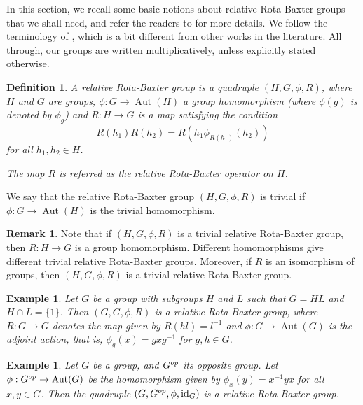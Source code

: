 \documentclass[11pt]{amsart}
\theoremstyle{thrm}
\theoremstyle{plain}
\newtheorem{defn}[thm]{Definition}
\newtheorem{example}[thm]{Example}
\theoremstyle{definition}
\newtheorem{remark}[equation]{Remark}
\newcommand{\Id}{\operatorname{id}}
\newcommand{\Aut}{\operatorname{Aut} }
\numberwithin{equation}{section}
\begin{document}
In this section, we recall some basic notions about relative Rota-Baxter groups that we shall need, and refer the readers to \cite{JYC22, NM1} for more details. We follow the  terminology of \cite{NM1}, which is a bit different from other works in the literature. All through, our groups are written multiplicatively, unless explicitly stated otherwise.

\begin{defn}
A relative Rota-Baxter group is a quadruple $(H, G, \phi, R)$, where $H$ and $G$ are groups, $\phi: G \rightarrow \Aut(H)$ a group homomorphism (where $\phi(g)$ is denoted by $\phi_g$) and $R: H \rightarrow G$ is a map satisfying the condition $$R(h_1) R(h_2)=R(h_1 \phi_{R(h_1)}(h_2))$$ for all $h_1, h_2 \in H$. 
\par
\noindent The map $R$ is referred as the relative Rota-Baxter operator on $H$.
\end{defn}

We say that the relative Rota-Baxter group  $(H, G, \phi, R)$ is trivial if $\phi:G \to \Aut(H)$ is the trivial homomorphism.


\begin{remark}
Note that if $(H, G, \phi, R)$ is  a trivial relative Rota-Baxter group, then $R:H \rightarrow G$ is a group homomorphism. Different homomorphisms give different trivial relative Rota-Baxter groups. Moreover, if $R$ is an isomorphism of groups, then $(H, G, \phi, R)$ is  a trivial relative Rota-Baxter group. 
\end{remark}

\begin{example}
Let $G$ be a group with subgroups $H$ and $L$ such that $G=HL$ and $H\cap L=\{1\}$. Then $(G,G, \phi, R)$ is a relative Rota-Baxter group, where $R: G \rightarrow G$ denotes the map given by $R(hl) = l^{-1}$ and $\phi : G \rightarrow \Aut(G)$ is the adjoint action, that is, $\phi_g(x) = gxg^{-1}$ for $g, h \in G$.
\end{example}

\begin{example}
Let $G$ be a group, and $G^{\rm op}$ its opposite group. Let $\phi: G^{\rm op} \rightarrow \Aut(G)$ be the homomorphism given by $\phi_x(y) = x^{-1} y x$ for all $x, y \in G$. Then the quadruple $(G, G^{\rm op}, \phi, \Id_G)$ is a relative Rota-Baxter group.
\end{example}
\end{document}
